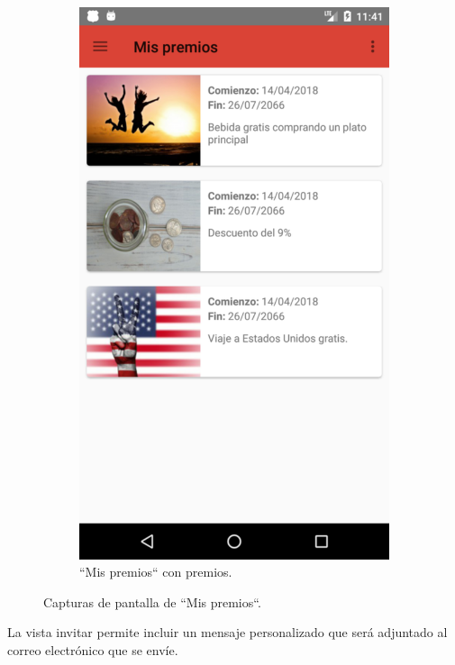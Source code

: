 \documentclass[twoside]{report}
\begin{document}
\begin{figure}[H]
\begin{center}
\begin{subfigure}[t]{.3\linewidth}
		\includegraphics[scale=0.2]{images/userguide/10.png}
		\caption{“Mis premios“ con premios.}
	\end{subfigure}
\caption{Capturas de pantalla de “Mis premios“.}
\end{center}
\end{figure}

La vista invitar permite incluir un mensaje personalizado que será adjuntado al correo electrónico que se envíe.
\end{document}
